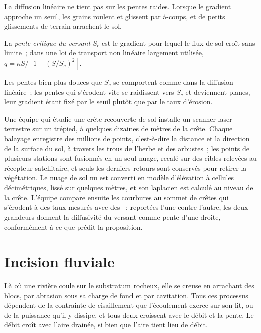 La diffusion linéaire ne tient pas sur les pentes raides. Lorsque le gradient approche
un seuil, les grains roulent et glissent par à-coups, et de petits glissements de terrain
arrachent le sol.

\begin{definition}\label{def:b3:quantitative-geomorphology:critical}
La \emph{pente critique du versant}
$S_c$ est le gradient pour lequel le flux de sol croît sans limite~; dans une loi
de transport non linéaire largement utilisée, $q = \kappa S/[1 - (S/S_c)^2]$.
\end{definition}

Les pentes bien plus douces que $S_c$ se comportent comme dans la diffusion linéaire~; les pentes qui
s'érodent vite se raidissent vers $S_c$ et deviennent planes, leur gradient étant fixé par le
seuil plutôt que par le taux d'érosion.

\begin{inthefield}
Une équipe qui étudie une crête recouverte de sol installe un scanner laser terrestre sur
un trépied, à quelques dizaines de mètres de la crête. Chaque balayage enregistre
des millions de points, c'est-à-dire la distance et la direction de la surface du sol, à travers les
trous de l'herbe et des arbustes~; les points de plusieurs stations sont fusionnés
en un seul nuage, recalé sur des cibles relevées au récepteur satellitaire,
et seuls les derniers retours sont conservés pour retirer la végétation. Le nuage de sol nu
est converti en modèle d'élévation à cellules décimétriques, lissé sur quelques
mètres, et son laplacien est calculé au niveau de la crête. L'équipe compare ensuite les
courbures au sommet de crêtes qui s'érodent à des taux mesurés avec des ~: reportées l'une contre l'autre, les deux grandeurs donnent la diffusivité du
versant comme pente d'une droite, conformément à ce que prédit la proposition.
\end{inthefield}

\section{Incision fluviale}\label{sec:b3:quantitative-geomorphology:rivers}

Là où une rivière coule sur le substratum rocheux, elle se creuse en arrachant des blocs, par abrasion
sous sa charge de fond et par cavitation. Tous ces processus dépendent de la contrainte de
cisaillement que l'écoulement exerce sur son lit, ou de la puissance qu'il y dissipe, et tous deux
croissent avec le débit et la pente. Le débit croît avec l'aire drainée, si bien que l'aire
tient lieu de débit.

